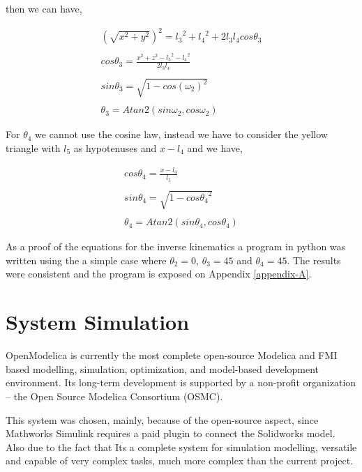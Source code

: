 \documentclass[transmag]{IEEEtran}
\begin{document}
then we can have,

\begin{equation}
\begin{matrix}
(\sqrt{x^2 + y^2})^2 = {l_3}^2 +  {l_4}^2 + 2l_3l_4 cos\theta_3 \\
\\
cos\theta_3 = \frac{x^2 + z^2 - {l_3}^2 - {l_4}^2}{2l_3l_4} \\
\\
sin \theta_3 = \sqrt{1 - cos(\omega_2)^2} \\
\\
\theta_3 = Atan2(sin\omega_2, cos\omega_2)
\end{matrix}
\end{equation}


For $\theta_4$ we cannot use the cosine law, instead we have to consider the yellow triangle with $l_5$ as hypotenuses and $x - l_4$ and we have,





\begin{equation}
\begin{matrix}
cos\theta_4 = \frac{x-l_4}{l_5} \\
\\
sin\theta_4 = \sqrt{1 - {cos\theta_4}^2} \\
\\
\theta_4 = Atan2(sin\theta_4, cos\theta_4)
\end{matrix}
\end{equation}


As a proof of the equations for the inverse kinematics a program in python was written using the a simple case where $\theta_2 = 0$, $\theta_3 = 45$ and $\theta_4 = 45$. The results were consistent and the program is exposed on Appendix \ref{appendix-A}.





\section{System Simulation}

OpenModelica is currently the most complete open-source Modelica and FMI based modelling, simulation, optimization, and model-based development environment. Its long-term development is supported by a non-profit organization – the Open Source Modelica Consortium (OSMC). \cite{ref2}

This system was chosen, mainly, because of the open-source aspect, since Mathworks Simulink requires a paid plugin to connect the Solidworks model. Also due to the fact that Its a complete system for simulation modelling, versatile and capable of very complex tasks, much more complex than the current project.
\end{document}
